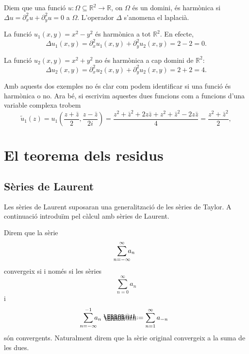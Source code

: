 \documentclass[12pt,twoside]{report}
\makeatletter
\numberwithin{table}{section}
\numberwithin{equation}{section}
\numberwithin{figure}{section}
\newcommand{\R}{\ensuremath{\mathbb{R}}}
\newcommand{\funcio}[3]{#1 \colon #2 \longrightarrow #3}
\newcommand*{\defeq}{\mathrel{\rlap{%
    \raisebox{0.3ex}{$\m@th\cdot$}}%
  \raisebox{-0.3ex}{$\m@th\cdot$}}%
	=
}
\makeatother
\begin{document}
\begin{defn}
	Diem que una funció \( \funcio{u}{\Omega \subseteq \R^2}{\R} \), on \( \Omega \) és un domini, és harmònica si \( \Delta u = \partial_x^2 u + \partial_y^2 u = 0 \) a \( \Omega \). L'operador \( \Delta \) s'anomena el laplacià.
\end{defn}

\begin{exe}
	\begin{punts}
		\item[]
		\item La funció \( u_1(x,y) = x^2 - y^2 \) és harmònica a tot \( \R^2 \). En efecte,
			\begin{equation*}
				\Delta u_1(x,y) = \partial_x^2 u_1(x,y) + \partial_y^2 u_2(x,y) = 2 - 2 = 0.
			\end{equation*}
		\item La funció \( u_2(x,y) = x^2 + y^2 \) no és harmònica a cap domini de \( \R^2 \):
			\begin{equation*}
				\Delta u_2(x,y) = \partial_x^2 u_2(x,y) + \partial_y^2 u_2(x,y) = 2 + 2 = 4.
			\end{equation*}
	\end{punts}	
\end{exe}

Amb aquests dos exemples no és clar com podem identificar si una funció és harmònica o no. Ara bé, si escrivim aquestes dues funcions com a funcions d'una variable complexa trobem
\begin{equation*}
	\tilde{u}_1(z) = u_1\left(\frac{z + \bar{z}}{2}, \frac{z - \bar{z}}{2i}\right) = \frac{z^2 + \bar{z}^2 + 2z\bar{z} + z^2 + \bar{z}^2 - 2z\bar{z}}{4} = \frac{z^2 + \bar{z}^2}{2},
\end{equation*}


\chapter{El teorema dels residus}
\section{Sèries de Laurent}
Les sèries de Laurent suposaran una generalització de les sèries de Taylor. A continuació introduïm pel càlcul amb sèries de Laurent.  

\begin{defn}\label{def:series generalitzades}
	Direm que la sèrie \[ \sum_{\mathclap{n = -\infty}}^{\infty}a_n  \] convergeix si i només si les sèries \[ \sum_{n = 0}^{\infty}a_n \] i \[ \sum_{\mathclap{n = -\infty}}^{-1}a_n \defeq \sum_{n = 1}^{\infty}a_{-n} \] són convergents. Naturalment direm que la sèrie original convergeix a la suma de les dues. 
\end{defn}
\end{document}
